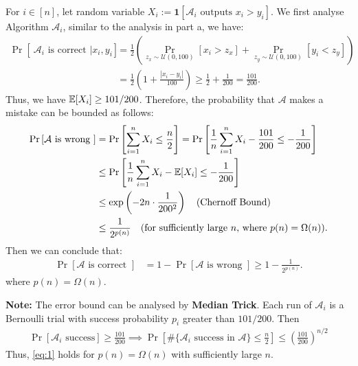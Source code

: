 \begin{answer}
\begin{enumerate}[label=\alph*).]
    For $i \in [n]$, let random variable $X_i := \mathbf{1}[\mathcal{A}_i \text{ outputs } x_i > y_i]$. 
    We first analyse Algorithm $\mathcal{A}_i$, similar to the analysis in part a, we have:
    \begin{align*}
        \Pr\left[\ \mathcal{A}_i\text{ is correct } | x_i, y_i\right] &= \frac{1}{2} \left(\Pr_{z_x\sim \mathcal{U}(0,100)}[x_i > z_x] + \Pr_{z_y\sim \mathcal{U}(0,100)}[y_i < z_y]\right) \\
        &= \frac{1}{2}\left(1 + \frac{|x_i - y_i|}{100}\right) \ge \frac{1}{2} + \frac{1}{200} = \frac{101}{200}.
    \end{align*}
    Thus, we have $\operatorname*{\mathbb{E}}[X_i] \ge 101/200$. Therefore, the probability that $\mathcal{A}$ makes a mistake can be bounded as follows:
    \begin{align*}
        \Pr\left[\mathcal{A} \text{ is wrong }\right] &= \Pr\left[\sum_{i=1}^{n} X_i \le \frac{n}{2}\right] = \Pr\left[\frac{1}{n} \sum_{i=1}^{n} X_i - \frac{101}{200} \le - \frac{1}{200}\right] \\
        &\le \Pr\left[\frac{1}{n} \sum_{i=1}^{n} X_i - \operatorname*{\mathbb{E}}[X_i] \le -\frac{1}{200}\right] \\
        &\le \exp\left(- 2n \cdot \frac{1}{200^2}\right) \quad \text{(Chernoff Bound)} \\
        &\le \frac{1}{2^{p(n)}} \quad \text{(for sufficiently large $n$, where $p(n) = \Omega(n)$)}.
    \end{align*}
    Then we can conclude that:
    \begin{align}
        \label{eq:1}
        \Pr\left[\mathcal{A} \text{ is correct }\right] &= 1 - \Pr\left[\mathcal{A} \text{ is wrong }\right] \ge 1 - \frac{1}{2^{p(n)}}.
    \end{align}
    where $p(n) = \Omega(n)$. 

    \textbf{Note:} The error bound can be analysed by \textbf{Median Trick}. Each run of $\mathcal{A}_i$ is a Bernoulli trial with success probability $p_i$ greater than $101/200$. Then
    \begin{align*}
        \Pr\left[\mathcal{A}_i \text{ success}\right] \ge \frac{101}{200} \implies \Pr\left[\#\{\mathcal{A}_i \text{ success in } \mathcal{A}\} \le \frac{n}{2}\right] \le \left(\frac{101}{200}\right)^{n/2}
    \end{align*}
    Thus, \eqref{eq:1} holds for $p(n) = \Omega(n)$ with sufficiently large $n$.
\end{enumerate}
\ed

\end{answer}